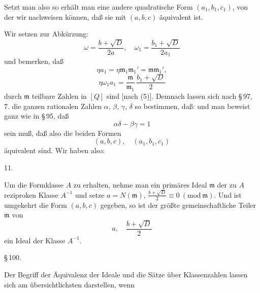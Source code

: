 
Setzt man also
so erhält man eine andere quadratische Form $(a_1,b_1,c_1)$, von der wir nachweisen können, daß sie mit $(a,b,c)$ äquivalent ist.

Wir setzen zur Abkürzung:
\[
\omega = \frac{b+\sqrt{D}}{2a},\quad \omega_1 = \frac{b_1+\sqrt{D}}{2a_1}
\]
und bemerken, daß
\[
\eta a_1 = \eta \mathfrak{m}_1\mathfrak{m}_1' = \mathfrak{m}\mathfrak{m}_1',
\]
\[
\eta \omega_1 a_1 = \frac{\mathfrak{m}}{\mathfrak{m}_1}\,\frac{b_1+\sqrt{D}}{2}
\]
durch $\mathfrak{m}$ teilbare Zahlen in $[Q]$ sind [nach (5)]. Demnach lassen sich nach \S\,97, 7. die ganzen rationalen Zahlen $\alpha$, $\beta$, $\gamma$, $\delta$ so bestimmen, daß:
und man beweist ganz wie in \S\,95, daß
\[
\alpha\delta - \beta\gamma = 1
\]
sein muß, daß also die beiden Formen
\[
(a,b,c),\quad (a_1,b_1,c_1)
\]
äquivalent sind. Wir haben also:

11. 

Um die Formklasse $A$ zu erhalten, nehme man ein primäres Ideal $\mathfrak{m}$ der zu $A$ reziproken Klasse $A^{-1}$ und setze $a = N(\mathfrak{m})$,
$\frac{b+\sqrt{D}}{2} \equiv 0\ (\mathrm{mod}\ \mathfrak{m})$. Und ist umgekehrt die Form $(a,b,c)$ gegeben, so ist der größte gemeinschaftliche Teiler $\mathfrak{m}$ von
\[
a,\quad \frac{b+\sqrt{D}}{2}
\]
ein Ideal der Klasse $A^{-1}$.

\begin{center}
\S\,100. 
\end{center}

Der Begriff der Äquivalenz der Ideale und die Sätze über Klassenzahlen lassen sich am übersichtlichsten darstellen, wenn
